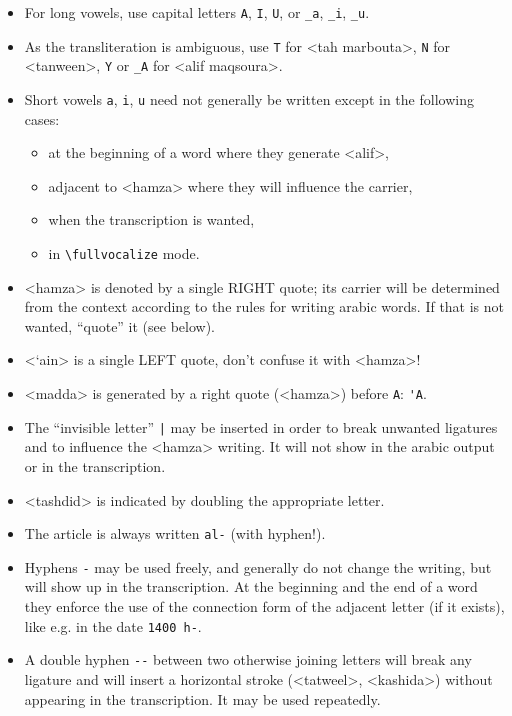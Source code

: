 \documentclass[pagesize=auto]{scrartcl}
\newcommand*{\symb}[1]{\textsf{\textlangle#1\textrangle}}
\def\symb#1{<#1>}%
\begin{document}
\begin{itemize}
\item For long vowels, use capital letters \verb+A+, \verb+I+, \verb+U+, or \verb+_a+, \verb+_i+, \verb+_u+.
\item As the transliteration is ambiguous, use \verb+T+ for \symb{tah marbouta}, 
  \verb+N+ for \symb{tanween}, \verb+Y+ or \verb+_A+ for \symb{alif maqsoura}.
\item Short vowels \verb+a+, \verb+i+, \verb+u+ need not generally be written except in the 
  following cases:
  \begin{itemize}
  \item at the beginning of a word where they generate \symb{alif}, 
  \item adjacent to \symb{hamza} where they will influence the carrier, 
  \item when the transcription is wanted, 
  \item in \verb+\fullvocalize+ mode. 
  \end{itemize}
\item \symb{hamza} is denoted by a single RIGHT quote; its carrier will be 
  determined from the context according to the rules for writing arabic 
  words. If that is not wanted, ``quote'' it (see below). 
\item \symb{`ain} is a single LEFT quote, don't confuse it with \symb{hamza}!
\item \symb{madda} is generated by a right quote (\symb{hamza}) before \verb+A+: \verb+'A+.
\item The ``invisible letter'' \verb+|+ may be inserted in order to break unwanted 
  ligatures and to influence the \symb{hamza} writing. It will not show in the 
  arabic output or in the transcription. 
\item \symb{tashdid} is indicated by doubling the appropriate letter.
\item The article is always written \verb+al-+ (with hyphen!).
\item Hyphens \verb+-+ may be used freely, and generally do not change the writing, 
  but will show up in the transcription. At the beginning and the end of a 
  word they enforce the use of the connection form of the adjacent letter 
  (if it exists), like e.g. in the date \verb+1400 h-+. 
\item A double hyphen \verb+--+ between two otherwise joining letters will break 
  any ligature and will insert a horizontal stroke (\symb{tatweel}, \symb{kashida}) 
  without appearing in the transcription. It may be used repeatedly. 
\end{itemize}
\end{document}
